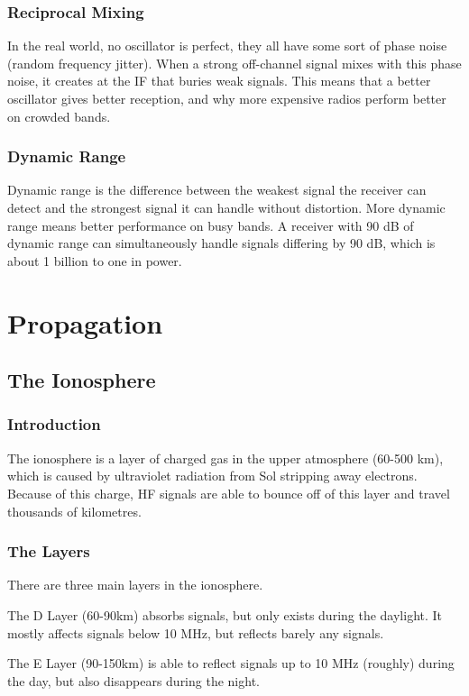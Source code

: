 \documentclass{article}
\begin{document}
\subsubsection{Reciprocal Mixing}
In the real world, no oscillator is perfect, they all have some sort of phase noise (random frequency jitter). When a strong off-channel signal mixes with this phase noise, it creates at the IF that buries weak signals. This means that a better oscillator gives better reception, and why more expensive radios perform better on crowded bands.

\subsubsection{Dynamic Range}
Dynamic range is the difference between the weakest signal the receiver can detect and the strongest signal it can handle without distortion. More dynamic range means better performance on busy bands. A receiver with 90 dB of dynamic range can simultaneously handle signals differing by 90 dB, which is about 1 billion to one in power.

\section{Propagation}
\subsection{The Ionosphere}
\subsubsection{Introduction}
The ionosphere is a layer of charged gas in the upper atmosphere (60-500 km), which is caused by ultraviolet radiation from Sol stripping away electrons. Because of this charge, HF signals are able to bounce off of this layer and travel thousands of kilometres.

\subsubsection{The Layers}
There are three main layers in the ionosphere.

The D Layer (60-90km) absorbs signals, but only exists during the daylight. It mostly affects signals below 10 MHz, but reflects barely any signals.

The E Layer (90-150km) is able to reflect signals up to 10 MHz (roughly) during the day, but also disappears during the night.
\end{document}
